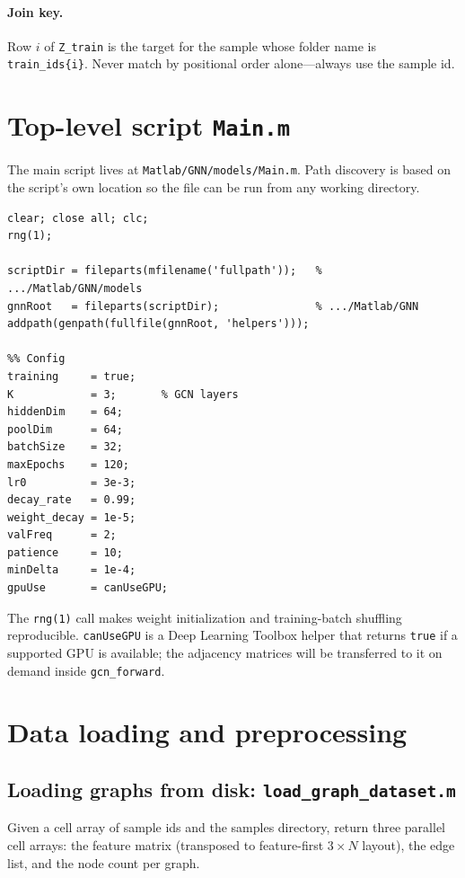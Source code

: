 \documentclass[11pt]{article}
\begin{document}
\paragraph{Join key.} Row $i$ of \texttt{Z\_train} is the target for the
sample whose folder name is \texttt{train\_ids\{i\}}. Never match by
positional order alone---always use the sample id.

\section{Top-level script \texttt{Main.m}}

The main script lives at
\texttt{Matlab/GNN/models/Main.m}. Path discovery is based on the script's own
location so the file can be run from any working directory.

\begin{lstlisting}[caption={Setup and configuration (\texttt{Main.m} head)},
                   label={lst:main-setup}]
clear; close all; clc;
rng(1);

scriptDir = fileparts(mfilename('fullpath'));   % .../Matlab/GNN/models
gnnRoot   = fileparts(scriptDir);               % .../Matlab/GNN
addpath(genpath(fullfile(gnnRoot, 'helpers')));

%% Config
training     = true;
K            = 3;       % GCN layers
hiddenDim    = 64;
poolDim      = 64;
batchSize    = 32;
maxEpochs    = 120;
lr0          = 3e-3;
decay_rate   = 0.99;
weight_decay = 1e-5;
valFreq      = 2;
patience     = 10;
minDelta     = 1e-4;
gpuUse       = canUseGPU;
\end{lstlisting}

The \texttt{rng(1)} call makes weight initialization and training-batch
shuffling reproducible. \texttt{canUseGPU} is a Deep Learning Toolbox helper
that returns \texttt{true} if a supported GPU is available; the adjacency
matrices will be transferred to it on demand inside \texttt{gcn\_forward}.

\section{Data loading and preprocessing}

\subsection{Loading graphs from disk: \texttt{load\_graph\_dataset.m}}

Given a cell array of sample ids and the samples directory, return three
parallel cell arrays: the feature matrix (transposed to feature-first
$3\times N$ layout), the edge list, and the node count per graph.
\end{document}
